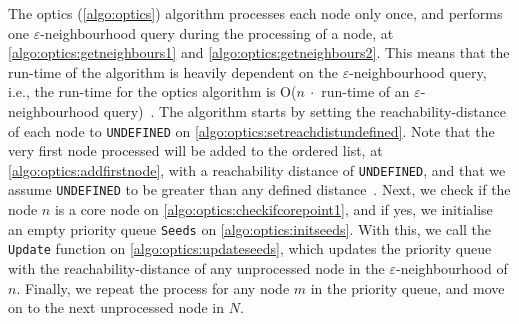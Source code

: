 The \gls{optics} (\autoref{algo:optics}) algorithm processes each node only once, and performs one $\varepsilon$-neighbourhood query during the processing of a node, at \autoref{algo:optics:getneighbours1} and \autoref{algo:optics:getneighbours2}. This means that the run-time of the algorithm is heavily dependent on the $\varepsilon$-neighbourhood query, i.e., the run-time for the \gls{optics} algorithm is O($n \ \cdot $ run-time of an $\varepsilon$-neighbourhood query)~\cite[p.~53]{Ankerst:1999:OOP:304182.304187}. The algorithm starts by setting the reachability-distance of each node to \texttt{UNDEFINED} on \autoref{algo:optics:setreachdistundefined}. Note that the very first node processed will be added to the ordered list, at \autoref{algo:optics:addfirstnode}, with a reachability distance of \texttt{UNDEFINED}, and that we assume \texttt{UNDEFINED} to be greater than any defined distance~\cite[p.~54]{Ankerst:1999:OOP:304182.304187}. Next, we check if the node $n$ is a core node on \autoref{algo:optics:checkifcorepoint1}, and if yes, we initialise an empty priority queue \texttt{Seeds} on \autoref{algo:optics:initseeds}. With this, we call the \texttt{Update} function on \autoref{algo:optics:updateseeds}, which updates the priority queue with the reachability-distance of any unprocessed node in the $\varepsilon$-neighbourhood of $n$. Finally, we repeat the process for any node $m$ in the priority queue, and move on to the next unprocessed node in $N$.\medbreak

